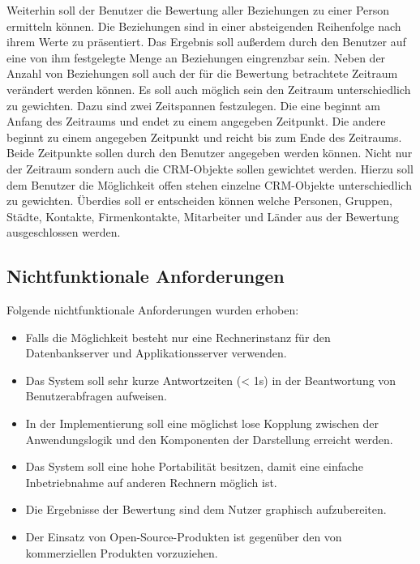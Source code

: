 Weiterhin soll der Benutzer die Bewertung aller Beziehungen zu einer Person ermitteln können. Die Beziehungen sind in einer absteigenden Reihenfolge nach ihrem Werte zu präsentiert. Das Ergebnis soll außerdem durch den Benutzer auf eine von ihm festgelegte Menge an Beziehungen eingrenzbar sein. Neben der Anzahl von Beziehungen soll auch der für die Bewertung betrachtete Zeitraum verändert werden können. Es soll auch möglich sein den Zeitraum unterschiedlich zu gewichten. Dazu sind zwei Zeitspannen festzulegen. Die eine beginnt am Anfang des Zeitraums und endet zu einem angegeben Zeitpunkt. Die andere beginnt zu einem angegeben Zeitpunkt und reicht bis zum Ende des Zeitraums. Beide Zeitpunkte sollen durch den Benutzer angegeben werden können. Nicht nur der Zeitraum sondern auch die CRM-Objekte sollen gewichtet werden. Hierzu soll dem Benutzer die Möglichkeit offen stehen einzelne CRM-Objekte unterschiedlich zu gewichten. Überdies soll er entscheiden können welche Personen, Gruppen, Städte, Kontakte, Firmenkontakte, Mitarbeiter und Länder aus der Bewertung ausgeschlossen werden.

\subsection{Nichtfunktionale Anforderungen}

Folgende nichtfunktionale Anforderungen wurden erhoben:

\begin{itemize}
	
	\item Falls die Möglichkeit besteht nur eine Rechnerinstanz für den Datenbankserver und Applikationsserver verwenden.
	
	\item Das System soll sehr kurze Antwortzeiten (< 1s) in der Beantwortung von Benutzerabfragen aufweisen. 
	
	\item In der Implementierung soll eine möglichst lose Kopplung zwischen der Anwendungslogik und den Komponenten der Darstellung erreicht werden.
	
	\item Das System soll eine hohe Portabilität besitzen, damit eine einfache Inbetriebnahme auf anderen Rechnern möglich ist.
	
	\item Die Ergebnisse der Bewertung sind dem Nutzer graphisch aufzubereiten. 
	
	\item Der Einsatz von Open-Source-Produkten ist gegenüber den von kommerziellen Produkten vorzuziehen.

\end{itemize}

